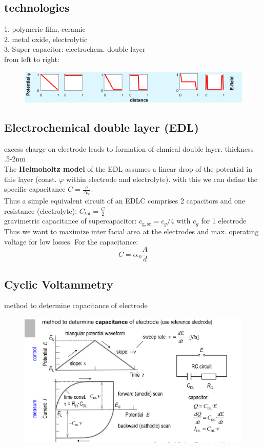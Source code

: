 \documentclass[a4paper,10pt,landscape]{scrartcl}
\begin{document}
\begin{multicols*}{3}
\subsection{technologies}
1. polymeric film, ceramic\\
2. metal oxide, electrolytic\\
3. Super-capacitor: electrochem. double layer\\
from left to right: 
\begin{figure}[H]
    \centering
    \includegraphics[width=1\linewidth]{src/supercap.png}
\end{figure}
\subsection{Electrochemical double layer (EDL)}
excess charge on electrode leads to formation of chmical double layer. thickness .5-2nm\\
The \textbf{Helmoholtz model} of the EDL assumes a linear drop of the potential in this layer (const. $\varphi$ within electrode and electrolyte). with this we can define the specific capacitance $C=\frac{\sigma}{\Delta \varphi}$. \\
Thus a simple equivalent circuit of an EDLC comprises 2 capacitors and one resistance (electrolyte): $C_{tot}=\frac{C}{2}$ \\
gravimetric capacitance of supercapacitor: $c_\mathrm{g,sc}=c_g/4$
with $c_g$ for 1 electrode \\
Thus we want to maximize inter facial area at the electrodes and max. operating voltage for low losses. For the capacitance:
$$C=\epsilon\epsilon_0\frac{A}{d}$$
\subsection{Cyclic Voltammetry}
method to determine capacitance of electrode
\begin{figure}[H]
    \centering
    \includegraphics[width=0.75\linewidth]{src/cv.png}
\end{figure}


\end{multicols*}
\end{document}
